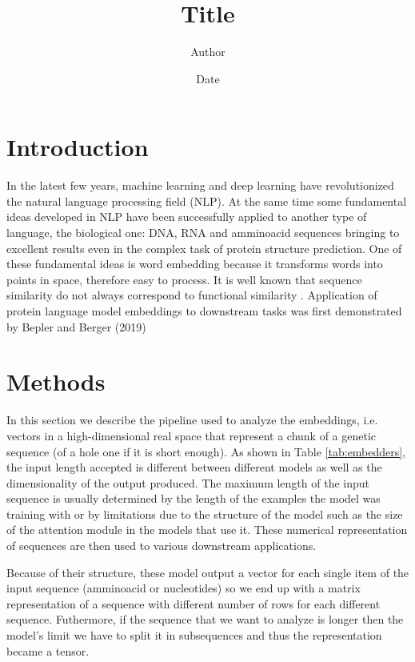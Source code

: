 \documentclass[12pt, letterpaper, twocolumn]{article}
\title{Title}
\author{Author}
\date{Date}
\begin{document}
\maketitle


\section{Introduction}
In the latest few years, machine learning and deep learning have revolutionized the natural language processing field (NLP)\cite{khurana2023natural}. At the same time some fundamental ideas developed in NLP have been successfully applied to another type of language, the biological one: DNA, RNA and amminoacid sequences bringing to excellent results even in the complex task of protein structure prediction\cite{jumper2021highly, lin2022language}. One of these fundamental ideas is word embedding \cite{mikolov2013efficient} because it transforms words into points in space, therefore easy to process.
It is well known that sequence similarity do not always correspond to functional similarity \cite{kosloff2008sequence}.
Application of protein language model embeddings to downstream tasks was first demonstrated by Bepler and Berger (2019) \cite{bepler2019learning}

\section{Methods}

In this section we describe the pipeline used to analyze the embeddings, i.e. vectors in a high-dimensional real space that represent a chunk of a genetic sequence (of a hole one if it is short enough). As shown in Table \ref{tab:embedders}, the input length accepted is different between different models as well as the dimensionality of the output produced. The maximum length of the input sequence is usually determined by the length of the examples the model was training with or by limitations due to the structure of the model such as the size of the attention module in the models that use it. These numerical representation of sequences are then used to various downstream applications.

Because of their structure, these model output a vector for each single item of the input sequence (amminoacid or nucleotides) so we end up with a matrix representation of a sequence with different number of rows for each different sequence. Futhermore, if the sequence that we want to analyze is longer then the model's limit we have to split it in subsequences and thus the representation became a tensor. 
\end{document}
